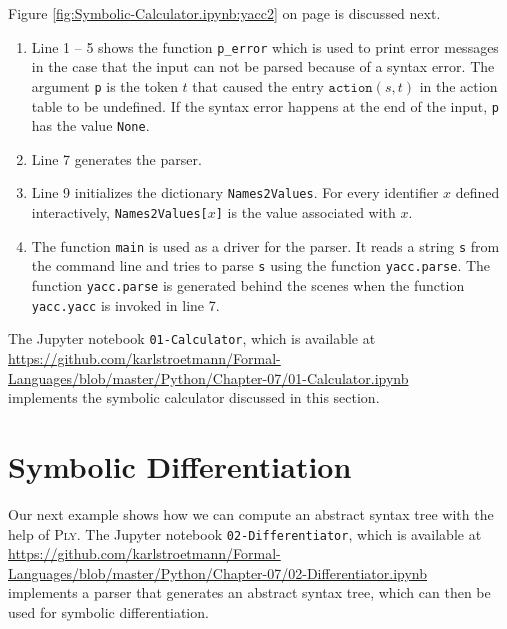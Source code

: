 \noindent
Figure \ref{fig:Symbolic-Calculator.ipynb:yacc2} on page \pageref{fig:Symbolic-Calculator.ipynb:yacc2}
is discussed next.
\begin{enumerate}
\item Line 1 -- 5 shows the function \texttt{p\_error} which is used to print error messages in the case that
      the input can not be parsed because of a syntax error.  The argument \texttt{p} is the token $t$ that
      caused the entry $\texttt{action}(s, t)$ in the action table to be undefined.
      If the syntax error happens at the end of the input, \texttt{p} has the value \texttt{None}.
\item Line 7 generates the parser.
\item Line 9 initializes the dictionary \texttt{Names2Values}.  For every identifier $x$ defined interactively,
      \texttt{Names2Values[$x$]} is the value associated with $x$.
\item The function \texttt{main} is used as a driver for the parser.  It reads a string \texttt{s}
      from the command line and tries to parse \texttt{s} using the function \texttt{yacc.parse}.
      The function \texttt{yacc.parse} is generated behind the scenes when the function \texttt{yacc.yacc} is
      invoked in line 7. 
\end{enumerate}

The Jupyter notebook \texttt{01-Calculator}, which is available at
\\[0.2cm]
\hspace*{0.3cm}
\href{https://github.com/karlstroetmann/Formal-Languages/blob/master/Python/Chapter-07/01-Calculator.ipynb}{https://github.com/karlstroetmann/Formal-Languages/blob/master/Python/Chapter-07/01-Calculator.ipynb}
\\[0.2cm]
implements the symbolic calculator discussed in this section.

\section{Symbolic Differentiation}
Our next example shows how we can compute an abstract syntax tree with the help of \textsc{Ply}.
The Jupyter notebook \texttt{02-Differentiator}, which is available at
\\[0.2cm]
\hspace*{0.3cm}
\href{https://github.com/karlstroetmann/Formal-Languages/blob/master/Python/Chapter-07/02-Differentiator.ipynb}{https://github.com/karlstroetmann/Formal-Languages/blob/master/Python/Chapter-07/02-Differentiator.ipynb}
\\[0.2cm]
implements a parser that generates an abstract syntax tree, which can then be used for symbolic
differentiation.
\pagebreak

